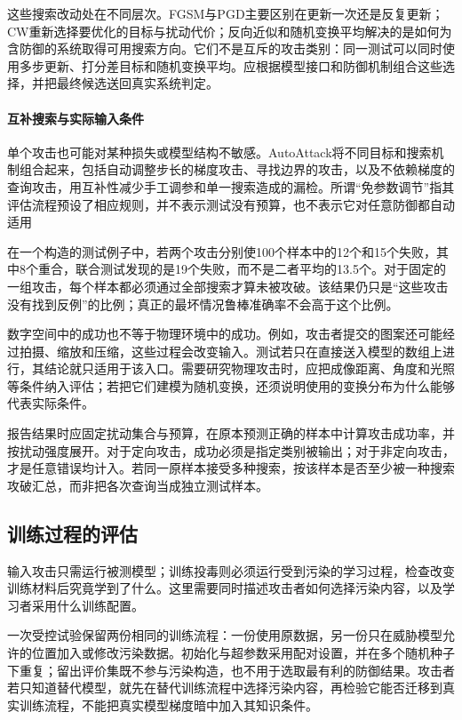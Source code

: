 这些搜索改动处在不同层次。FGSM与PGD主要区别在更新一次还是反复更新；CW重新选择要优化的目标与扰动代价；反向近似和随机变换平均解决的是如何为含防御的系统取得可用搜索方向。它们不是互斥的攻击类别：同一测试可以同时使用多步更新、打分差目标和随机变换平均。应根据模型接口和防御机制组合这些选择，并把最终候选送回真实系统判定。

\paragraph{互补搜索与实际输入条件}

单个攻击也可能对某种损失或模型结构不敏感。AutoAttack将不同目标和搜索机制组合起来，包括自动调整步长的梯度攻击、寻找边界的攻击，以及不依赖梯度的查询攻击，用互补性减少手工调参和单一搜索造成的漏检。所谓“免参数调节”指其评估流程预设了相应规则，并不表示测试没有预算，也不表示它对任意防御都自动适用

在一个构造的测试例子中，若两个攻击分别使100个样本中的12个和15个失败，其中8个重合，联合测试发现的是19个失败，而不是二者平均的13.5个。对于固定的一组攻击，每个样本都必须通过全部搜索才算未被攻破。该结果仍只是“这些攻击没有找到反例”的比例；真正的最坏情况鲁棒准确率不会高于这个比例。

数字空间中的成功也不等于物理环境中的成功。例如，攻击者提交的图案还可能经过拍摄、缩放和压缩，这些过程会改变输入。测试若只在直接送入模型的数组上进行，其结论就只适用于该入口。需要研究物理攻击时，应把成像距离、角度和光照等条件纳入评估；若把它们建模为随机变换，还须说明使用的变换分布为什么能够代表实际条件。

报告结果时应固定扰动集合与预算，在原本预测正确的样本中计算攻击成功率，并按扰动强度展开。对于定向攻击，成功必须是指定类别被输出；对于非定向攻击，才是任意错误均计入。若同一原样本接受多种搜索，按该样本是否至少被一种搜索攻破汇总，而非把各次查询当成独立测试样本。

\subsection{训练过程的评估}
\label{sec:security-training-test}

输入攻击只需运行被测模型；训练投毒则必须运行受到污染的学习过程，检查改变训练材料后究竟学到了什么。这里需要同时描述攻击者如何选择污染内容，以及学习者采用什么训练配置。

一次受控试验保留两份相同的训练流程：一份使用原数据，另一份只在威胁模型允许的位置加入或修改污染数据。初始化与超参数采用配对设置，并在多个随机种子下重复；留出评价集既不参与污染构造，也不用于选取最有利的防御结果。攻击者若只知道替代模型，就先在替代训练流程中选择污染内容，再检验它能否迁移到真实训练流程，不能把真实模型梯度暗中加入其知识条件。

